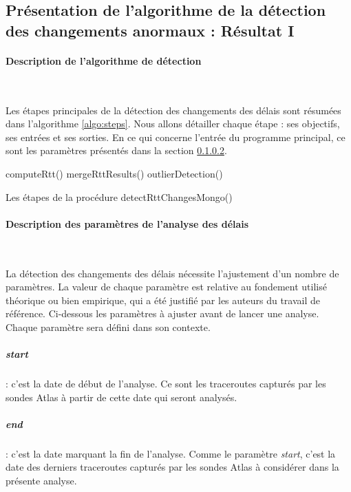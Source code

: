 \subsection{Présentation de l'algorithme de la détection des changements anormaux : Résultat I}

\paragraph{Description de l'algorithme de détection} ~

Les étapes principales de la détection des changements des délais sont résumées dans l'algorithme \ref{algo:steps}. Nous allons détailler chaque étape : ses objectifs, ses entrées et ses sorties. En ce qui concerne l'entrée du programme principal, ce sont les paramètres présentés dans la section  \ref{par:parametre-de-lanalyse}.


\begin{algorithm}[H]

 	\begin{algorithmic}[1]
 		\State computeRtt()
 		\State mergeRttResults()
 		\State outlierDetection()
 		\EndFor
 		\EndProcedure
 	\end{algorithmic}
 	\caption{Les étapes de la procédure detectRttChangesMongo()}
 	\label{algo:steps}
\end{algorithm}

\paragraph{Description des paramètres de l'analyse des délais} \label{par:parametre-de-lanalyse}~

La détection des changements des délais nécessite l'ajustement d'un nombre de paramètres. La valeur de chaque paramètre est relative au  fondement utilisé théorique ou bien empirique, qui a été  justifié par les auteurs du travail de référence.   Ci-dessous les paramètres à ajuster avant de lancer une analyse.  Chaque paramètre sera défini dans son contexte.

\subparagraph{start} : c'est la date de début de l'analyse. Ce sont les traceroutes capturés par les sondes Atlas à partir de cette date qui seront analysés.

\subparagraph{end} : c'est la date marquant la fin de l'analyse. Comme le paramètre \textit{start}, c'est la date des derniers traceroutes capturés par les sondes Atlas à considérer dans la présente analyse.

